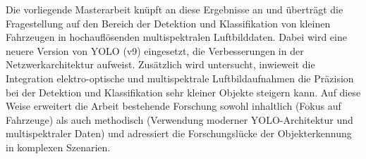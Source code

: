 Die vorliegende Masterarbeit knüpft an diese Ergebnisse an und überträgt die Fragestellung auf den Bereich der Detektion und Klassifikation von kleinen Fahrzeugen in hochauflösenden multispektralen Luftbilddaten. Dabei wird eine neuere Version von \acrfull{YOLO} (v9) eingesetzt, die Verbesserungen in der Netzwerkarchitektur aufweist. Zusätzlich wird untersucht, inwieweit die Integration elektro-optische und multispektrale Luftbildaufnahmen  die Präzision bei der Detektion und Klassifikation sehr kleiner Objekte steigern kann. Auf diese Weise erweitert die Arbeit bestehende Forschung sowohl inhaltlich (Fokus auf Fahrzeuge) als auch methodisch (Verwendung moderner YOLO-Architektur und multispektraler Daten) und adressiert die Forschungslücke der Objekterkennung in komplexen Szenarien.





